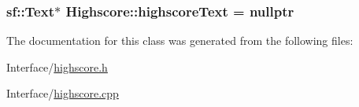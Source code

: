 \subsubsection[{\texorpdfstring{highscore\+Text}{highscoreText}}]{\setlength{\rightskip}{0pt plus 5cm}sf\+::\+Text$\ast$ Highscore\+::highscore\+Text = nullptr\hspace{0.3cm}{\ttfamily [protected]}}\hypertarget{classHighscore_a4b09b1cd06d8344957beff965b809f38}{}\label{classHighscore_a4b09b1cd06d8344957beff965b809f38}


The documentation for this class was generated from the following files\+:\begin{DoxyCompactItemize}
\item 
Interface/\hyperlink{highscore_8h}{highscore.\+h}\item 
Interface/\hyperlink{highscore_8cpp}{highscore.\+cpp}\end{DoxyCompactItemize}

